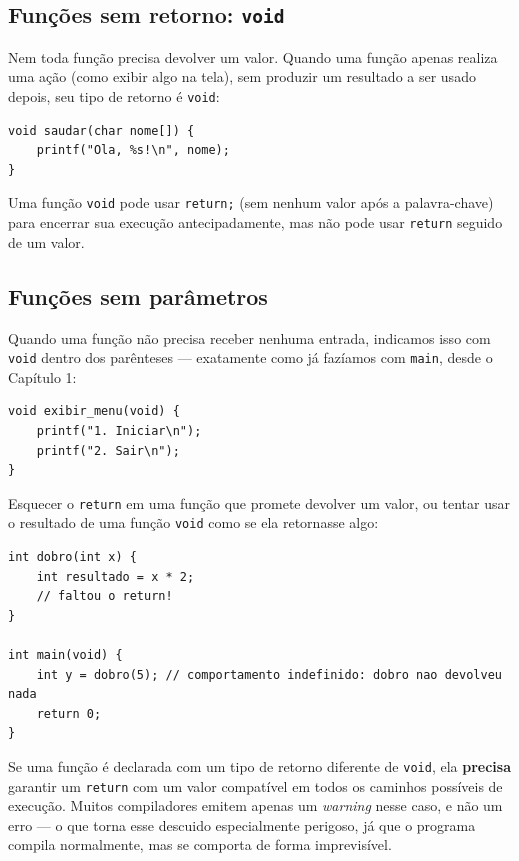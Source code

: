\documentclass[12pt,a4paper,oneside]{extreport}
\begin{document}
\subsection{Funções sem retorno: \texttt{void}}

Nem toda função precisa devolver um valor. Quando uma função apenas realiza uma ação (como exibir algo na tela), sem produzir um resultado a ser usado depois, seu tipo de retorno é \texttt{void}:

\begin{lstlisting}
void saudar(char nome[]) {
    printf("Ola, %s!\n", nome);
}
\end{lstlisting}

Uma função \texttt{void} pode usar \texttt{return;} (sem nenhum valor após a palavra-chave) para encerrar sua execução antecipadamente, mas não pode usar \texttt{return} seguido de um valor.

\subsection{Funções sem parâmetros}

Quando uma função não precisa receber nenhuma entrada, indicamos isso com \texttt{void} dentro dos parênteses — exatamente como já fazíamos com \texttt{main}, desde o Capítulo 1:

\begin{lstlisting}
void exibir_menu(void) {
    printf("1. Iniciar\n");
    printf("2. Sair\n");
}
\end{lstlisting}

\begin{errocomum}
Esquecer o \texttt{return} em uma função que promete devolver um valor, ou tentar usar o resultado de uma função \texttt{void} como se ela retornasse algo:
\begin{lstlisting}
int dobro(int x) {
    int resultado = x * 2;
    // faltou o return!
}

int main(void) {
    int y = dobro(5); // comportamento indefinido: dobro nao devolveu nada
    return 0;
}
\end{lstlisting}
Se uma função é declarada com um tipo de retorno diferente de \texttt{void}, ela \textbf{precisa} garantir um \texttt{return} com um valor compatível em todos os caminhos possíveis de execução. Muitos compiladores emitem apenas um \textit{warning} nesse caso, e não um erro — o que torna esse descuido especialmente perigoso, já que o programa compila normalmente, mas se comporta de forma imprevisível.
\end{errocomum}
\end{document}
